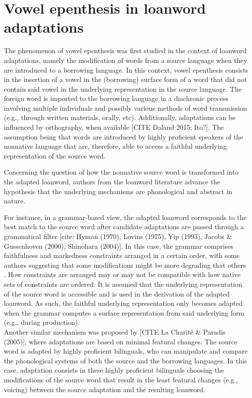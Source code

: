 \section{Vowel epenthesis in loanword adaptations}
The phenomenon of vowel epenthesis was first studied in the context of loanword adaptations, namely the modification of words from a source language when they are introduced to a borrowing language. In this context, vowel epenthesis consists in the insertion of a vowel in the (borrowing) surface form of a word that did not contain said vowel in the underlying representation in the source language.  
The foreign word is imported to the borrowing language in a diachronic process involving multiple individuals and possibly various methods of word transmission (e.g., through written materials, orally, etc). Additionally, adaptations can be influenced by orthography, when available [CITE Daland 2015; Ito?]. The assumption being that words are introduced by highly proficient speakers of the nonnative language that are, therefore, able to access a faithful underlying representation of the source word. 

Concerning the question of how the nonnative source word is transformed into the adapted loanword, authors from the loanword literature advance the hypothesis that the underlying mechanisms are phonological and abstract in nature.

For instance, in a grammar-based view, the adapted loanword corresponds to the best match to the source word after candidate adaptations are passed through a grammatical filter  [cite: Hyman (1970), Lovins (1975), Yip (1993), Jacobs \& Gussenhoven (2000), Shinohara (2004)]. In this case, the grammar comprises faithfulness and markedness constraints arranged in a certain order, with some authors suggesting that some modifications might be more degrading that others \cite{steriade2001}. How constraints are arranged may or may not be compatible with how native sets of constraints are ordered. It is assumed that the underlying representation of the source word is accessible and is used in the derivation of the adapted loanword. As such, the faithful underlying representation only becomes adapted when the grammar computes a surface representation from said underlying form (e.g., during production).   \\

Another similar mechanism was proposed by [CITE La Charité \& Paradis (2005)], where adaptations are based on minimal featural changes. The source word is adapted by highly proficient bilinguals, who can manipulate and compare the phonological systems of both the source and the borrowing languages. In this case, adaptation consists in these highly proficient bilinguals choosing the modifications of the source word that result in the least featural changes (e.g., voicing) between the source adaptation and the resulting loanword.  

